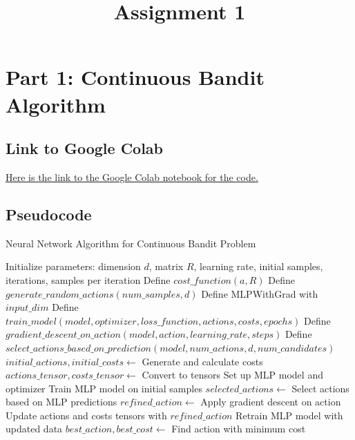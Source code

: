 \documentclass{article}
\title{Assignment 1}
\date{}
\author{}
\begin{document}
\maketitle
\section*{Part 1: Continuous Bandit Algorithm}
\subsection*{Link to Google Colab}
\href{https://colab.research.google.com/drive/1vRuHc6DXpbGOX94KGNAtKen7xMg2giJH?usp=sharing}{Here is the link to the Google Colab notebook for the code.}


\subsection*{Pseudocode}
\begin{algorithm}
    \caption{Neural Network Algorithm for Continuous Bandit Problem}
    \begin{algorithmic}[1]
    \State Initialize parameters: dimension $d$, matrix $R$, learning rate, initial samples, iterations, samples per iteration
    \State Define $cost\_function(a, R)$
    \State Define $generate\_random\_actions(num\_samples, d)$
    \State Define MLPWithGrad with $input\_dim$
    \State Define $train\_model(model, optimizer, loss\_function, actions, costs, epochs)$
    \State Define $gradient\_descent\_on\_action(model, action, learning\_rate, steps)$
    \State Define $select\_actions\_based\_on\_prediction(model, num\_actions, d, num\_candidates)$
    \State $initial\_actions, initial\_costs \gets$ Generate and calculate costs
    \State $actions\_tensor, costs\_tensor \gets$ Convert to tensors
    \State Set up MLP model and optimizer
    \State Train MLP model on initial samples
        \State $selected\_actions \gets$ Select actions based on MLP predictions
            \State $refined\_action \gets$ Apply gradient descent on action
            \State Update actions and costs tensors with $refined\_action$
        \EndFor
        \State Retrain MLP model with updated data
    \EndFor
    \State $best\_action, best\_cost \gets$ Find action with minimum cost
    \end{algorithmic}
\end{algorithm}
\end{document}
